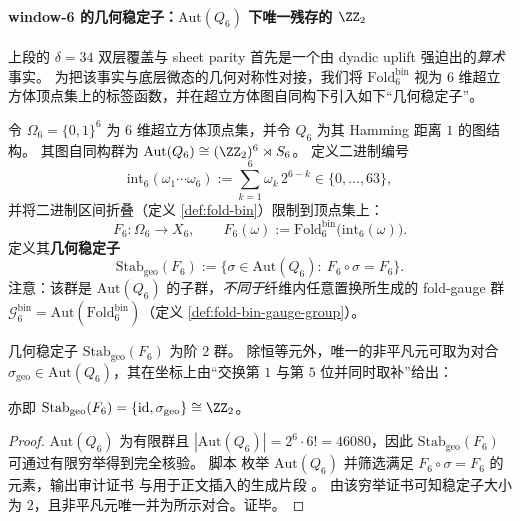\paragraph{window-6 的几何稳定子：\texorpdfstring{$\mathrm{Aut}(Q_6)$}{Aut(Q6)} 下唯一残存的 \texorpdfstring{$\ZZ_2$}{Z2}}
上段的 \(\delta=34\) 双层覆盖与 sheet parity 首先是一个由 dyadic uplift 强迫出的\emph{算术}事实。
为把该事实与底层微态的几何对称性对接，我们将 \(\mathrm{Fold}^{\mathrm{bin}}_6\) 视为 \(6\) 维超立方体顶点集上的标签函数，并在超立方体图自同构下引入如下“几何稳定子”。\par
令 \(\Omega_6=\{0,1\}^6\) 为 \(6\) 维超立方体顶点集，并令 \(Q_6\) 为其 Hamming 距离 \(1\) 的图结构。
其图自同构群为
\(
\mathrm{Aut}(Q_6)\cong (\ZZ_2)^6\rtimes S_6
\)。
定义二进制编号
\[
\mathrm{int}_6(\omega_1\cdots\omega_6):=\sum_{k=1}^6 \omega_k\,2^{6-k}\in\{0,\dots,63\},
\]
并将二进制区间折叠（定义 \ref{def:fold-bin}）限制到顶点集上：
\[
F_6:\Omega_6\to X_6,\qquad F_6(\omega):=\mathrm{Fold}^{\mathrm{bin}}_6\bigl(\mathrm{int}_6(\omega)\bigr).
\]
定义其\textbf{几何稳定子}
\[
\mathrm{Stab}_{\mathrm{geo}}(F_6)
:=\bigl\{\sigma\in \mathrm{Aut}(Q_6):\ F_6\circ\sigma=F_6\bigr\}.
\]
注意：该群是 \(\mathrm{Aut}(Q_6)\) 的子群，\emph{不同于}纤维内任意置换所生成的 fold-gauge 群
\(\mathcal{G}^{\mathrm{bin}}_6=\mathrm{Aut}(\mathrm{Fold}^{\mathrm{bin}}_6)\)（定义 \ref{def:fold-bin-gauge-group}）。\par

\begin{theorem}\label{thm:foldbin6-geo-stabilizer-z2}
几何稳定子 \(\mathrm{Stab}_{\mathrm{geo}}(F_6)\) 为阶 \(2\) 群。
除恒等元外，唯一的非平凡元可取为对合
\(\sigma_{\mathrm{geo}}\in\mathrm{Aut}(Q_6)\)，其在坐标上由“交换第 \(1\) 与第 \(5\) 位并同时取补”给出：

亦即
\(
\mathrm{Stab}_{\mathrm{geo}}(F_6)=\{\mathrm{id},\sigma_{\mathrm{geo}}\}\cong\ZZ_2
\)。
\end{theorem}
\begin{proof}
\(\mathrm{Aut}(Q_6)\) 为有限群且 \(|\mathrm{Aut}(Q_6)|=2^6\cdot 6!=46080\)，因此 \(\mathrm{Stab}_{\mathrm{geo}}(F_6)\) 可通过有限穷举得到完全核验。
脚本 \texttt{} 枚举 \(\mathrm{Aut}(Q_6)\) 并筛选满足 \(F_6\circ\sigma=F_6\) 的元素，输出审计证书
\texttt{} 与用于正文插入的生成片段
\texttt{}。
由该穷举证书可知稳定子大小为 \(2\)，且非平凡元唯一并为所示对合。证毕。
\end{proof}

